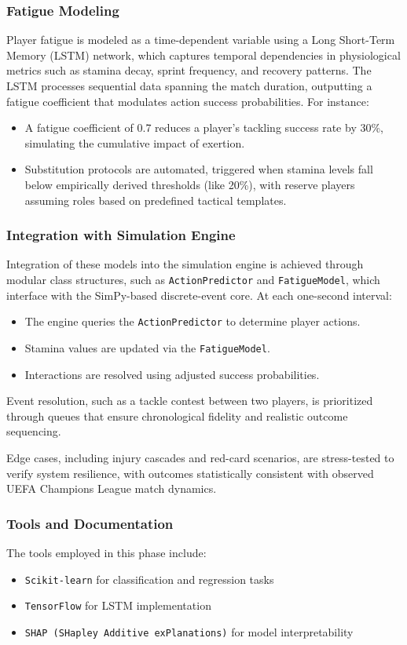 \documentclass[12pt]{article}
\begin{document}
\subsubsection{Fatigue Modeling}
Player fatigue is modeled as a time-dependent variable using a Long Short-Term Memory (LSTM) network, which captures temporal dependencies in physiological metrics such as stamina decay, sprint frequency, and recovery patterns. The LSTM processes sequential data spanning the match duration, outputting a fatigue coefficient that modulates action success probabilities. For instance:
\begin{itemize}
    \item A fatigue coefficient of 0.7 reduces a player's tackling success rate by 30\%, simulating the cumulative impact of exertion.
    \item Substitution protocols are automated, triggered when stamina levels fall below empirically derived thresholds (like 20\%), with reserve players assuming roles based on predefined tactical templates.
\end{itemize}

\subsubsection{Integration with Simulation Engine}
Integration of these models into the simulation engine is achieved through modular class structures, such as \texttt{ActionPredictor} and \texttt{FatigueModel}, which interface with the SimPy-based discrete-event core. At each one-second interval:
\begin{itemize}
    \item The engine queries the \texttt{ActionPredictor} to determine player actions.
    \item Stamina values are updated via the \texttt{FatigueModel}.
    \item Interactions are resolved using adjusted success probabilities.
\end{itemize}

Event resolution, such as a tackle contest between two players, is prioritized through queues that ensure chronological fidelity and realistic outcome sequencing.

Edge cases, including injury cascades and red-card scenarios, are stress-tested to verify system resilience, with outcomes statistically consistent with observed UEFA Champions League match dynamics.

\subsubsection{Tools and Documentation}
The tools employed in this phase include:
\begin{itemize}
    \item \texttt{Scikit-learn} for classification and regression tasks
    \item \texttt{TensorFlow} for LSTM implementation
    \item \texttt{SHAP (SHapley Additive exPlanations)} for model interpretability
\end{itemize}
\end{document}
